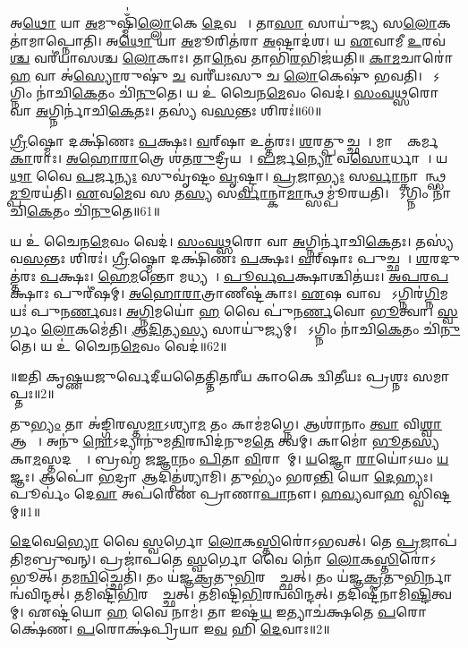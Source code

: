    𑌅\ul{𑌥𑍋} 𑌯𑌾 \ul{𑌅}𑌮𑍁𑌷𑍍𑌮𑌿𑌁॑\ul{𑌲𑍍𑌲𑍋}𑌕𑍇 \ul{𑌦𑍇}𑌵𑌤𑌾𑌃᳚।
   𑌤𑌾\ul{𑌸𑌾}\ul{} 𑌸𑌾𑌯𑍁॑𑌜𑍍𑌯 𑌸\ul{𑌲𑍋}𑌕𑌤𑌾॑𑌮𑌾\-𑌪𑍍𑌨𑍋𑌤𑌿।
   𑌅\ul{𑌥𑍋} 𑌯𑌾 \ul{𑌅}𑌮𑍂𑌰𑌿𑌤॑𑌰𑌾 \ul{𑌅}𑌷𑍍𑌟𑌾𑌦॑𑌶।
   𑌯 \ul{𑌏}𑌵𑌾𑌮𑍀 \ul{𑌉}𑌰𑌵॑\ul{𑌶𑍍𑌚} 𑌵𑌰𑍀॑𑌯𑌾𑌸𑌶𑍍𑌚 \ul{𑌲𑍋}𑌕𑌾𑌃।
   𑌤𑌾\ul{𑌨𑍇}𑌵 𑌤𑌾𑌭𑌿॑\ul{𑌰}𑌭𑌿𑌜॑𑌯𑌤𑌿॥
   \ul{𑌕𑌾}\ul{𑌮}𑌚𑌾𑌰𑍋॑ \ul{𑌹} 𑌵𑌾 𑌅॑\ul{𑌸𑍍𑌯𑍋}𑌰𑍁𑌷𑍁॑ \ul{𑌚} 𑌵𑌰𑍀॑𑌯𑌃𑌸𑍁 𑌚 \ul{𑌲𑍋}𑌕𑍇𑌷𑍁॑ 𑌭𑌵𑌤𑌿।
   𑌯𑍋᳚𑌽𑌗𑍍𑌨𑌿𑌂 𑌨𑌾॑𑌚𑌿\ul{𑌕𑍇}𑌤𑌂 𑌚𑌿॑\ul{𑌨𑍁}𑌤𑍇।
   𑌯 𑌉॑ 𑌚𑍈𑌨\ul{𑌮𑍇}𑌵𑌂 𑌵𑍇𑌦॑।
   \ul{𑌸𑌂}\ul{𑌵}\ul{𑌥𑍍𑌸}𑌰𑍋 𑌵𑌾 \ul{𑌅}𑌗𑍍𑌨𑌿𑌰𑍍𑌨𑌾॑𑌚𑌿\ul{𑌕𑍇}𑌤𑌃।
   𑌤𑌸𑍍𑌯॑ 𑌵\ul{𑌸}𑌨𑍍𑌤𑌃 𑌶𑌿𑌰𑌃॑॥60॥

   \ul{𑌗𑍍𑌰𑍀}𑌷𑍍𑌮𑍋 𑌦𑌕𑍍𑌷𑌿॑𑌣𑌃 \ul{𑌪}𑌕𑍍𑌷𑌃।
   \ul{𑌵}𑌰𑍍{‌}𑌷𑌾 𑌉𑌤𑍍𑌤॑𑌰𑌃।
   \ul{𑌶}𑌰𑌤𑍍𑌪𑍁𑌚𑍍𑌛𑌮𑍍᳚।
   𑌮𑌾𑌸𑌾𑌃᳚ 𑌕𑌰𑍍𑌮\ul{𑌕𑌾}𑌰𑌾𑌃।
   \ul{𑌅}\ul{𑌹𑍋}\ul{𑌰𑌾}𑌤𑍍𑌰𑍇 𑌶॑𑌤\ul{𑌰𑍁}𑌦𑍍𑌰𑍀𑌯𑌮𑍍᳚।
   \ul{𑌪}𑌰𑍍𑌜\ul{𑌨𑍍𑌯𑍋} 𑌵\ul{𑌸𑍋}𑌰𑍍𑌧𑌾𑌰𑌾᳚।
   𑌯\ul{𑌥𑌾} 𑌵𑍈 \ul{𑌪}𑌰𑍍𑌜\ul{𑌨𑍍𑌯𑌃} 𑌸𑍁𑌵𑍃॑𑌷𑍍𑌟𑌂 \ul{𑌵𑍃}𑌷𑍍𑌟𑍍𑌵𑌾।
   \ul{𑌪𑍍𑌰}𑌜𑌾\ul{𑌭𑍍𑌯𑌃} 𑌸\ul{𑌰𑍍𑌵𑌾}𑌨𑍍𑌕𑌾𑌮𑌾᳚𑌨𑍍𑌥𑍍𑌸\ul{𑌮𑍍𑌪𑍂}𑌰𑌯॑𑌤𑌿।
   \ul{𑌏}𑌵\ul{𑌮𑍇}𑌵 𑌸 𑌤\ul{𑌸𑍍𑌯} 𑌸\ul{𑌰𑍍𑌵𑌾}𑌨𑍍𑌕𑌾\ul{𑌮𑌾}𑌨𑍍𑌥𑍍𑌸𑌮𑍍𑌪𑍂॑𑌰𑌯𑌤𑌿।
   𑌯𑍋᳚𑌽𑌗𑍍𑌨𑌿𑌂 𑌨𑌾॑𑌚𑌿\ul{𑌕𑍇}𑌤𑌂 𑌚𑌿॑\ul{𑌨𑍁}𑌤𑍇॥61॥

   𑌯 𑌉॑ 𑌚𑍈𑌨\ul{𑌮𑍇}𑌵𑌂 𑌵𑍇𑌦॑।
   \ul{𑌸𑌂}\ul{𑌵}\ul{𑌥𑍍𑌸}𑌰𑍋 𑌵𑌾 \ul{𑌅}𑌗𑍍𑌨𑌿𑌰𑍍𑌨𑌾॑𑌚𑌿\ul{𑌕𑍇}𑌤𑌃।
   𑌤𑌸𑍍𑌯॑ 𑌵\ul{𑌸}𑌨𑍍𑌤𑌃 𑌶𑌿𑌰𑌃॑।
   \ul{𑌗𑍍𑌰𑍀}𑌷𑍍𑌮𑍋 𑌦𑌕𑍍𑌷𑌿॑𑌣𑌃 \ul{𑌪}𑌕𑍍𑌷𑌃।
   \ul{𑌵}𑌰𑍍{‌}𑌷𑌾𑌃 𑌪𑍁𑌚𑍍𑌛𑌮𑍍᳚।
   \ul{𑌶}𑌰𑌦𑍁𑌤𑍍𑌤॑𑌰𑌃 \ul{𑌪}𑌕𑍍𑌷𑌃।
   \ul{𑌹𑍇}\ul{𑌮}𑌨𑍍𑌤𑍋 𑌮𑌧𑍍𑌯𑌮𑍍᳚।
   \ul{𑌪𑍂}\ul{𑌰𑍍𑌵}\ul{𑌪}𑌕𑍍𑌷𑌾𑌶𑍍𑌚𑌿𑌤॑𑌯𑌃।
   \ul{𑌅}\ul{𑌪}\ul{𑌰}\ul{𑌪}𑌕𑍍𑌷𑌾𑌃 𑌪𑍁𑌰𑍀॑𑌷𑌮𑍍।
   \ul{𑌅}\ul{𑌹𑍋}\ul{𑌰𑌾}𑌤𑍍𑌰𑌾𑌣𑍀𑌷𑍍𑌟॑𑌕𑌾𑌃।
   \ul{𑌏}𑌷 𑌵𑌾𑌵 𑌸𑍋᳚𑌽𑌗𑍍𑌨𑌿𑌰॑\ul{𑌗𑍍𑌨𑌿}𑌮𑌯𑌃॑ 𑌪𑍁𑌨\ul{𑌰𑍍𑌣}𑌵𑌃।
   \ul{𑌅}\ul{𑌗𑍍𑌨𑌿}𑌮𑌯𑍋॑ \ul{𑌹} 𑌵𑍈 𑌪𑍁॑𑌨\ul{𑌰𑍍𑌣}𑌵𑍋 \ul{𑌭𑍂}𑌤𑍍𑌵𑌾।
   \ul{𑌸𑍍𑌵}𑌰𑍍𑌗𑌂 \ul{𑌲𑍋}𑌕𑌮𑍇॑𑌤𑌿।
   \ul{𑌆}\ul{𑌦𑌿}𑌤𑍍𑌯\ul{𑌸𑍍𑌯} 𑌸𑌾𑌯𑍁॑𑌜𑍍𑌯𑌮𑍍।
   𑌯𑍋᳚𑌽𑌗𑍍𑌨𑌿𑌂 𑌨𑌾॑𑌚𑌿\ul{𑌕𑍇}𑌤𑌂 𑌚𑌿॑\ul{𑌨𑍁}𑌤𑍇।
   𑌯 𑌉॑ 𑌚𑍈𑌨\ul{𑌮𑍇}𑌵𑌂 𑌵𑍇𑌦॑॥62॥
\anuvakamend

  ॥𑌇𑌤𑌿 𑌕𑍃𑌷𑍍𑌣𑌯𑌜𑍁𑌰𑍍𑌵𑍇𑌦𑍀𑌯𑌤𑍈𑌤𑍍𑌤𑌿𑌤𑌰𑍀𑌯 𑌕𑌾𑌠𑌕𑍇 𑌦𑍍𑌵𑌿𑌤𑍀𑌯𑌃 𑌪𑍍𑌰𑌶𑍍𑌨𑌃 𑌸𑌮𑌾𑌪𑍍𑌤𑌃॥2॥


\setcounter{anuvakam}{0}

   𑌤𑍁\ul{𑌭𑍍𑌯𑌂} 𑌤𑌾 𑌅॑𑌙𑍍𑌗𑌿𑌰𑌸𑍍𑌤\ul{𑌮𑌾}𑌽𑌶𑍍𑌯𑌾\ul{𑌮} 𑌤𑌂 𑌕𑌾𑌮॑𑌮𑌗𑍍𑌨𑍇।
   𑌆𑌶𑌾॑𑌨𑌾𑌂 \ul{𑌤𑍍𑌵𑌾} 𑌵𑌿\ul{𑌶𑍍𑌵𑌾} 𑌆𑌶𑌾𑌃᳚।
   𑌅𑌨𑍁॑ \ul{𑌨𑍋}𑌽𑌦𑍍𑌯𑌾𑌨𑍁॑𑌮\ul{𑌤𑌿}𑌰𑌨𑍍𑌵𑌿𑌦॑𑌨𑍁𑌮\ul{𑌤𑍇} 𑌤𑍍𑌵𑌮𑍍।
   𑌕𑌾𑌮𑍋॑ \ul{𑌭𑍂}𑌤\ul{𑌸𑍍𑌯} 𑌕𑌾\ul{𑌮}𑌸𑍍𑌤𑌦𑌗𑍍𑌰𑍇᳚।
   𑌬𑍍𑌰𑌹𑍍𑌮॑ 𑌜\ul{𑌜𑍍𑌞𑌾}𑌨𑌂 \ul{𑌪𑌿}𑌤𑌾 \ul{𑌵𑌿}𑌰𑌾𑌜𑌾᳚𑌮𑍍।
   \ul{𑌯}𑌜𑍍𑌞𑍋 \ul{𑌰𑌾}𑌯𑍋॑𑌽𑌯𑌂 \ul{𑌯}𑌜𑍍𑌞𑌃।
   𑌆𑌪𑍋॑ \ul{𑌭}𑌦𑍍𑌰𑌾 𑌆𑌦𑌿𑌤𑍍𑌪॑𑌶𑍍𑌯𑌾𑌮𑌿।
   𑌤𑍁𑌭𑍍𑌯𑌂॑ 𑌭𑌰\ul{𑌨𑍍𑌤𑌿} 𑌯𑍋 \ul{𑌦𑍇}𑌹𑍍𑌯𑌃।
   𑌪𑍂𑌰𑍍𑌵𑌂॑ 𑌦𑍇\ul{𑌵𑌾} 𑌅𑌪॑𑌰𑍇𑌣 𑌪𑍍𑌰𑌾𑌣𑌾\ul{𑌪𑌾}𑌨𑍗।
   \ul{𑌹}\ul{𑌵𑍍𑌯}𑌵𑌾\ul{𑌹}\ul{} 𑌸𑍍𑌵𑌿॑𑌷𑍍𑌟𑌮𑍍॥1॥\anuvakamend
  

   \ul{𑌦𑍇}𑌵𑍇\ul{𑌭𑍍𑌯𑍋} 𑌵𑍈 \ul{𑌸𑍍𑌵}𑌰𑍍𑌗𑍋 \ul{𑌲𑍋}𑌕\ul{𑌸𑍍𑌤𑌿}𑌰𑍋॑𑌽𑌭𑌵𑌤𑍍।
   𑌤𑍇 \ul{𑌪𑍍𑌰}𑌜𑌾𑌪॑𑌤𑌿𑌮𑌬𑍍𑌰𑍁𑌵𑌨𑍍।
   𑌪𑍍𑌰𑌜𑌾॑𑌪𑌤𑍇 \ul{𑌸𑍍𑌵}𑌰𑍍𑌗𑍋 𑌵𑍈 𑌨𑍋॑ \ul{𑌲𑍋}𑌕\ul{𑌸𑍍𑌤𑌿}𑌰𑍋॑𑌽𑌭𑍂𑌤𑍍।
   𑌤𑌮\ul{𑌨𑍍𑌵𑌿}𑌚𑍍𑌛𑍇𑌤𑌿॑।
   𑌤𑌂 𑌯॑𑌜𑍍𑌞\ul{𑌕𑍍𑌰}𑌤𑍁\ul{𑌭𑌿}𑌰𑌨𑍍𑌵𑍈᳚𑌚𑍍𑌛𑌤𑍍।
   𑌤𑌂 𑌯॑𑌜𑍍𑌞\ul{𑌕𑍍𑌰}𑌤𑍁\ul{𑌭𑌿}𑌰𑍍𑌨𑌾𑌨𑍍𑌵॑𑌵𑌿𑌨𑍍𑌦𑌤𑍍।
   𑌤𑌮𑌿𑌷𑍍𑌟𑌿॑\ul{𑌭𑌿}𑌰𑌨𑍍𑌵𑍈᳚𑌚𑍍𑌛𑌤𑍍।
   𑌤𑌮𑌿𑌷𑍍𑌟𑌿॑\ul{𑌭𑌿}𑌰𑌨𑍍𑌵॑𑌵𑌿𑌨𑍍𑌦𑌤𑍍।
   𑌤𑌦𑌿𑌷𑍍𑌟𑍀॑𑌨𑌾𑌮𑌿\ul{𑌷𑍍𑌟𑌿}\-𑌤𑍍𑌵𑌮𑍍।
   𑌏𑌷𑍍𑌟॑𑌯𑍋 \ul{𑌹} 𑌵𑍈 𑌨𑌾𑌮॑।
   𑌤𑌾 𑌇𑌷𑍍𑌟॑\ul{𑌯} 𑌇𑌤𑍍𑌯𑌾𑌚॑𑌕𑍍𑌷𑌤𑍇 \ul{𑌪}𑌰𑍋𑌕𑍍𑌷𑍇॑𑌣।
   \ul{𑌪}𑌰𑍋𑌕𑍍𑌷॑𑌪𑍍𑌰𑌿𑌯𑌾 𑌇\ul{𑌵} 𑌹𑌿 \ul{𑌦𑍇}𑌵𑌾𑌃॥2॥

